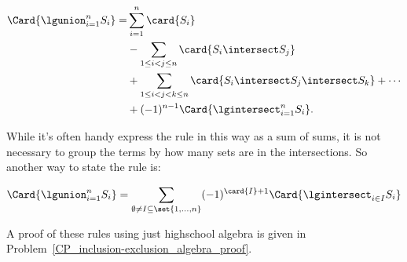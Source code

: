 \begin{rul*}
\begin{align*}
\Card{\lgunion_{i=1}^n S_i}
   = & \sum_{i=1}^n \card{S_i}\\
     & - \sum_{1\leq i < j \leq n} \card{S_i \intersect S_j}\\
     &  + \sum_{1\leq i < j < k \leq n} \card{S_i \intersect S_j
       \intersect S_k} + \cdots\\
     & + (-1)^{n-1} \Card{\lgintersect_{i=1}^n S_i}.
\end{align*}
\end{rul*}

While it's often handy express the rule in this way as a sum of sums,
it is not necessary to group the terms by how many sets are in the
intersections.  So another way to state the rule is:

\begin{rul*}
\[
\Card{\lgunion_{i=1}^n S_i}
   =  \sum_{\emptyset \neq I \subseteq \set{1,\dots,n}} (-1)^{\card{I}+1} \Card{\lgintersect_{i \in I} S_i}
\]
\end{rul*}

A proof of these rules using just highschool algebra is given in
Problem~\ref{CP_inclusion-exclusion_algebra_proof}.


